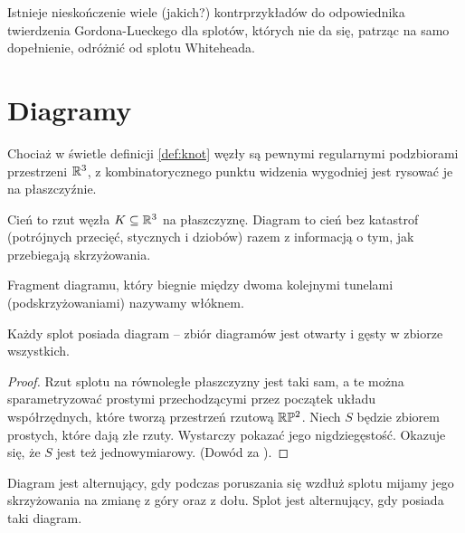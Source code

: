 Istnieje nieskończenie wiele (jakich?) kontrprzykładów do odpowiednika twierdzenia Gordona-Lueckego dla splotów,
których nie da się, patrząc na samo dopełnienie, odróżnić od splotu Whiteheada.

\section{Diagramy}
Chociaż w świetle definicji \ref{def:knot} węzły są pewnymi regularnymi podzbiorami przestrzeni $\mathbb R^3$,
z kombinatorycznego punktu widzenia wygodniej jest rysować je na  płaszczyźnie.

\begin{definition} [diagram] \label{def_diagrams}
	Cień to rzut węzła $K \subseteq \mathbb R^3$ na płaszczyznę.
	Diagram to cień bez katastrof
	(potrójnych przecięć, stycznych i dziobów)
	razem z informacją o tym, jak przebiegają skrzyżowania.
\end{definition}

\begin{definition} [włókno]
	Fragment diagramu, który biegnie między dwoma kolejnymi tunelami (podskrzyżowaniami) nazywamy włóknem.
\end{definition}

\begin{proposition}
	Każdy splot posiada diagram -- zbiór diagramów jest otwarty i gęsty w zbiorze wszystkich.
\end{proposition}

\begin{proof}
	Rzut splotu na równoległe płaszczyzny jest taki sam,
	a te można sparametryzować prostymi przechodzącymi przez początek układu współrzędnych,
	które tworzą przestrzeń rzutową $\mathbb R \mathbb P^2$.
	Niech $S$ będzie zbiorem prostych, które dają złe rzuty.
	Wystarczy pokazać jego nigdziegęstość.
	Okazuje się, że $S$ jest też jednowymiarowy.
	(Dowód za \cite{crowell63}).
\end{proof}

\begin{definition}
	Diagram jest alternujący,
	gdy podczas poruszania się wzdłuż splotu
	mijamy jego skrzyżowania na zmianę z góry oraz z dołu.
	Splot jest alternujący, gdy posiada taki diagram.
\end{definition}


